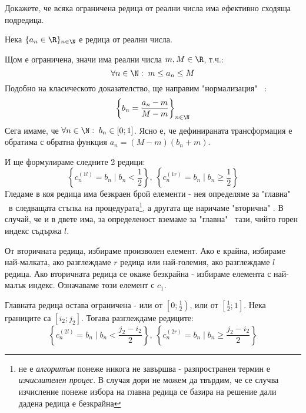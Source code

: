 \begin{problem}
    Докажете, че всяка ограничена редица от реални числа има ефективно сходяща подредица.
\end{problem}
\begin{solution}
    Нека $\{a_n \in \R\}_{n \in \N}$ е редица от реални числа.

    Щом е ограничена, значи има реални числа $m, M \in \R$, т.ч.:
    \begin{equation}
        \forall n\in \N:\; m \leq a_n \leq M
    \end{equation}
    Подобно на класическото доказателство, ще направим "нормализация" \ :
    \begin{equation}
        \left\{b_n = \frac{a_n - m}{M-m}\right\}_{n \in \N}
    \end{equation}
    Сега имаме, че $\forall n\in\N:\; b_n \in [0;1]$. Ясно е, че дефинираната трансформация е обратима с обратна функция $a_n = (M-m)(b_n+m)$.

    И ще формулираме следните 2 редици:
    \begin{equation}
        \left\{c^{(1l)}_n = b_n \mid b_n < \frac{1}{2}\right\},\  \left\{c^{(1r)}_n = b_n \mid b_n \geq \frac{1}{2}\right\}
    \end{equation}
    Гледаме в коя редица има безкраен брой елементи - нея определяме за "главна" \ в следващата стъпка на процедурата\footnote{не е \emph{алгоритъм} понеже никога не завършва - разпространен термин е \emph{изчислителен процес}. В случая дори не можем да твърдим, че се случва изчисление понеже избора на главна редица се базира на решение дали дадена редица е безкрайна}, а другата ще наричаме "вторична" . В случай, че и в двете има, за определеност вземаме за "главна" \ тази, чийто горен индекс съдържа $l$.

    От вторичната редица, избираме произволен елемент. Ако е крайна, избираме най-малката, ако разглеждаме $r$ редица или най-големия, ако разглеждаме $l$ редица. Ако вторичната редица се окаже безкрайна - избираме елемента с най-малък индекс. Означаваме този елемент с $c_1$.

    Главната редица остава ограничена - или от $\left[0;\frac{1}{2}\right)$, или от $\left[\frac{1}{2};1\right]$. Нека границите са $[i_2; j_2]$. Тогава разглеждаме редиците:
    \begin{equation}
        \left\{c^{(2l)}_n = b_n \mid b_n < \frac{j_2-i_2}{2}\right\},\  \left\{c^{(2r)}_n = b_n \mid b_n \geq \frac{j_2-i_2}{2}\right\}
    \end{equation}


\end{solution}
